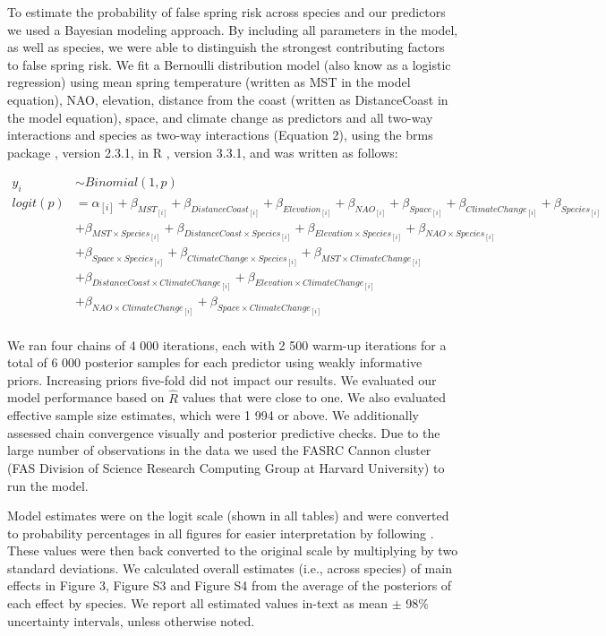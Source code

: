 \documentclass{article}\usepackage[]{graphicx}\usepackage[]{color}
\begin{document}
To estimate the probability of false spring risk across species and our predictors we used a Bayesian modeling approach. By including all parameters in the model, as well as species, we were able to distinguish the strongest contributing factors to false spring risk. We fit a Bernoulli distribution model (also know as a logistic regression) using mean spring temperature (written as MST in the model equation), NAO, elevation, distance from the coast (written as DistanceCoast in the model equation), space, and climate change as predictors and all two-way interactions and species as two-way interactions (Equation 2), using the brms package \citep{brms}, version 2.3.1,  in R \citep{R}, version 3.3.1, and was written as follows:

\begin{align*}
 y_i & \sim Binomial(1,p) \tag{2} \\
logit(p) &= \alpha_{[i]} + \beta_{MST_{[i]}} + \beta_{DistanceCoast_{[i]}} + \beta_{Elevation_{[i]}} + \beta_{NAO_{[i]}} + \beta_{Space_{[i]}} + \beta_{ClimateChange_{[i]}} + \beta_{Species_{[i]}} \\ 
  &+ \beta_{MST \times Species_{[i]}} + \beta_{DistanceCoast \times Species_{[i]}} + \beta_{Elevation \times Species_{[i]}} + \beta_{NAO \times Species_{[i]}}\\
  &+ \beta_{Space \times Species_{[i]}} + \beta_{ClimateChange \times Species_{[i]}} + \beta_{MST \times ClimateChange_{[i]}}\\ 
  &+ \beta_{DistanceCoast \times ClimateChange_{[i]}} + \beta_{Elevation \times ClimateChange_{[i]}}\\ 
  &+ \beta_{NAO \times ClimateChange_{[i]}} + \beta_{Space \times ClimateChange_{[i]}} \nonumber\\
\end{align*}

We ran four chains of 4 000 iterations, each with 2 500 warm-up iterations for a total of 6 000 posterior samples for each predictor using weakly informative priors. Increasing priors five-fold did not impact our results. We evaluated our model performance based on $\hat{R}$ values that were close to one. We also evaluated effective sample size estimates, which were 1 994 or above. We additionally assessed chain convergence visually and posterior predictive checks. Due to the large number of observations in the data we used the FASRC Cannon cluster (FAS Division of Science Research Computing Group at Harvard University) to run the model. 

Model estimates were on the logit scale (shown in all tables) and were converted to probability percentages in all figures for easier interpretation by following \cite{Gelman2006}. These values were then back converted to the original scale by multiplying by two standard deviations. We calculated overall estimates (i.e., across species) of main effects in Figure 3, Figure S3 and Figure S4 from the average of the posteriors of each effect by species. We report all estimated values in-text as mean $\pm$ 98\% uncertainty intervals, unless otherwise noted. 
\end{document}
